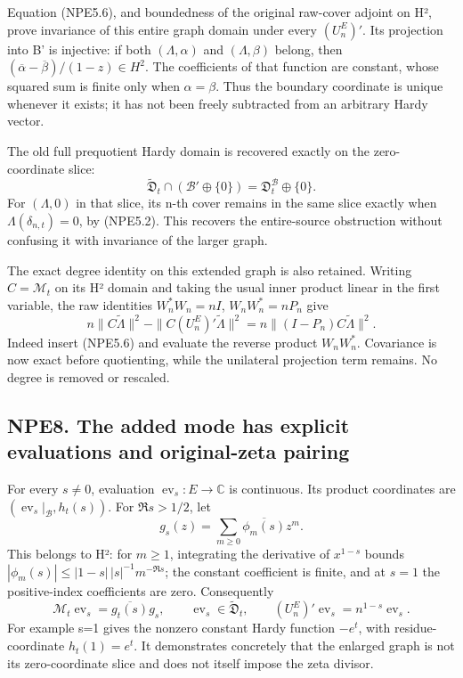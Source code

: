 Equation (NPE5.6), and boundedness of the original raw-cover adjoint on
H², prove invariance of this entire graph domain under every
\((U_n^E)'\). Its projection into B' is injective: if both
\((\Lambda,\alpha)\) and \((\Lambda,\beta)\) belong, then
\((\overline\alpha-\overline\beta)/(1-z)\in H^2\). The coefficients of
that function are constant, whose squared sum is finite only when
\(\alpha=\beta\). Thus the boundary coordinate is unique whenever it
exists; it has not been freely subtracted from an arbitrary Hardy
vector.

The old full prequotient Hardy domain is recovered exactly on the
zero-coordinate slice: \[
\widetilde{\mathfrak D}_t\cap(\mathcal B'\oplus\{0\})
=\mathfrak D_t^{\mathcal B}\oplus\{0\}.
\tag{NPE7.2}
\] For \((\Lambda,0)\) in that slice, its n-th cover remains in the same
slice exactly when \(\Lambda(\delta_{n,t})=0\), by (NPE5.2). This
recovers the entire-source obstruction without confusing it with
invariance of the larger graph.

The exact degree identity on this extended graph is also retained.
Writing \(C=\mathcal M_t\) on its H² domain and taking the usual inner
product linear in the first variable, the raw identities
\(W_n^*W_n=nI\), \(W_nW_n^*=nP_n\) give \[
n\|C\widetilde\Lambda\|^2-\|C(U_n^E)'\widetilde\Lambda\|^2
=n\|(I-P_n)C\widetilde\Lambda\|^2.
\tag{NPE7.3}
\] Indeed insert (NPE5.6) and evaluate the reverse product \(W_nW_n^*\).
Covariance is now exact before quotienting, while the unilateral
projection term remains. No degree is removed or rescaled.

\subsection{NPE8. The added mode has explicit evaluations and
original-zeta
pairing}\label{npe8.-the-added-mode-has-explicit-evaluations-and-original-zeta-pairing}

For every \(s\ne0\), evaluation \(\operatorname{ev}_s:E\to\mathbb C\) is
continuous. Its product coordinates are
\((\operatorname{ev}_s|_{\mathcal B},h_t(s))\). For \(\Re s>1/2\), let
\[
g_s(z)=\sum_{m\ge0}\overline{\phi_m(s)}z^m.
\] This belongs to H²: for \(m\ge1\), integrating the derivative of
\(x^{1-s}\) bounds \(|\phi_m(s)|\le |1-s|\,|s|^{-1}m^{-\Re s}\); the
constant coefficient is finite, and at \(s=1\) the positive-index
coefficients are zero. Consequently \[
\mathcal M_t\operatorname{ev}_s=\overline{g_t(s)}g_s,
\qquad \operatorname{ev}_s\in\widetilde{\mathfrak D}_t,
\qquad (U_n^E)'\operatorname{ev}_s=n^{1-s}\operatorname{ev}_s.
\tag{NPE8.1}
\] For example s=1 gives the nonzero constant Hardy function \(-e^t\),
with residue-coordinate \(h_t(1)=e^t\). It demonstrates concretely that
the enlarged graph is not its zero-coordinate slice and does not itself
impose the zeta divisor.

